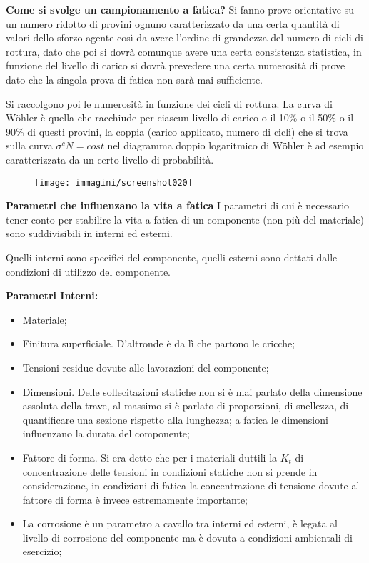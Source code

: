 \documentclass{article}
\begin{document}
		  \begin{adjustwidth}{2in}{}
		  
		  \textbf{Come si svolge un campionamento a fatica? } \newline		  
		  Si fanno prove orientative su un numero ridotto di provini ognuno caratterizzato da una certa quantità di valori dello sforzo agente così da avere l'ordine di grandezza del numero di cicli di rottura, dato che poi si dovrà comunque avere una certa consistenza statistica, in funzione del livello di carico si dovrà prevedere una certa numerosità di prove dato che la singola prova di fatica non sarà mai sufficiente.

		  Si raccolgono poi le numerosità in funzione dei cicli di rottura. La curva di Wöhler è quella che racchiude per ciascun livello di carico o il 10\% o il 50\% o il 90\% di questi provini, la coppia (carico applicato, numero di cicli) che si trova sulla curva $\sigma^cN=cost$ nel diagramma doppio logaritmico di Wöhler è ad esempio caratterizzata da un certo livello di probabilità.
		  
		  \begin{figure}[H]
		  	\centering
		  	\texttt{[image: immagini/screenshot020]}
		  	\label{fig:screenshot020}
		  \end{figure}
		  
		  \textbf{\Large Parametri che influenzano la vita a fatica} \newline 		  
		  I parametri di cui è necessario tener conto per stabilire la vita a fatica di un componente (non più del materiale) sono suddivisibili in interni ed esterni. 
		  
		  Quelli interni sono specifici del componente, quelli esterni sono dettati dalle condizioni di utilizzo del componente. \newline
 			
 		  \textbf{Parametri Interni:} 
 		  \begin{itemize}
 		  	\item Materiale;
 		  	\item Finitura superficiale. D'altronde è da lì che partono le cricche; 
 		  	\item Tensioni residue dovute alle lavorazioni del componente;
 		  	\item Dimensioni. Delle sollecitazioni statiche non si è mai parlato della dimensione assoluta della trave, al massimo si è parlato di proporzioni, di snellezza, di quantificare una sezione rispetto alla lunghezza; a fatica le dimensioni influenzano la durata del componente;
 		  	\item Fattore di forma. Si era detto che per i materiali duttili la $K_t$ di concentrazione delle tensioni in condizioni statiche non si prende in considerazione, in condizioni di fatica la concentrazione di tensione dovute al fattore di forma è invece estremamente importante;
 		  	\item La corrosione è un parametro a cavallo tra interni ed esterni, è legata al livello di corrosione del componente ma è dovuta a condizioni ambientali di esercizio;
 		  \end{itemize}
 		  

\end{adjustwidth}
\end{document}
